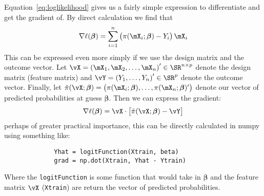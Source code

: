\documentclass[10pt]{article}
\begin{document}
Equation~\eqref{eq:loglikelihood} gives us a fairly simple expression to differentiate and get the gradient of. By direct calculation we find that 
\begin{equation}
	\label{eq:ellGrad}
	\nabla \ell(\boldsymbol{\beta}) = \sum_{i=1}^n \left(\pi(\mX_i; \boldsymbol{\beta}) - Y_i\right)\mX_i
\end{equation}
This can be expressed even more simply if we use the design matrix and the outcome vector. Let \(\vX = \left(\mX_1, \mX_2, \dots, \mX_n\right)' \in \SR^{n \times p}\) denote the design matrix (feature matrix) and \(\vY = \left(Y_1, \dots, Y_n\right)' \in \SR^p\) denote the outcome vector. Finally, let \(\tilde{\pi}(\vX;\boldsymbol{\beta}) = \left(\pi(\mX_i;\boldsymbol{\beta}),\dots, \pi(\mX_n;\boldsymbol{\beta})'\right)\) denote our vector of predicted probabilities at guess \(\boldsymbol{\beta}\). Then we can express the gradient: 
\begin{equation}
	\label{eq:matGrad}
	\nabla \ell(\boldsymbol{\beta}) = \vX\cdot\left[\tilde\pi(\vX;\boldsymbol{\beta}) - \vY\right]
\end{equation}
perhaps of greater practical importance, this can be directly calculated in numpy using something like:
\begin{figure}[htpb]
	\centering
	\begin{BVerbatim}
		Yhat = logitFunction(Xtrain, beta)
		grad = np.dot(Xtrain, Yhat - Ytrain)
	\end{BVerbatim}
\end{figure}
Where the \verb|logitFunction| is some function that would take in \(\boldsymbol{\beta}\) and the feature matrix \(\vX\) (\verb|Xtrain|) are return the vector of predicted probabilities.
\end{document}
